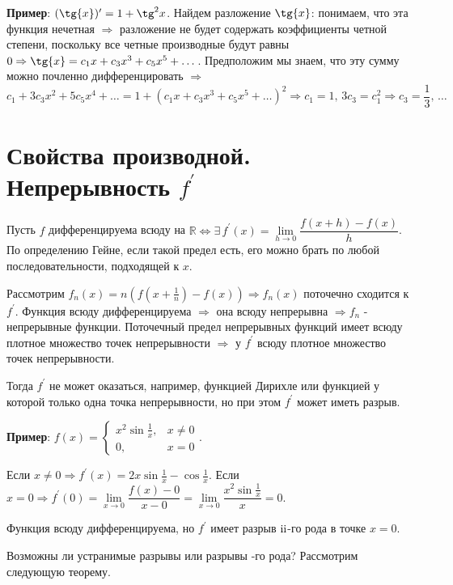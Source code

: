 \documentclass[12pt]{article}
\newcommand{\RN}[1]{%
	\textup{\uppercase\expandafter{\romannumeral#1}}%
}
\newcommand{\MR}{\mathbb{R}}
\theoremstyle{definition}
\begin{document}
\textbf{Пример}: $(\tg{x})^\prime = 1 + \tg^2{x}$. Найдем разложение $\tg{x}$: понимаем, что эта функция нечетная $\Rightarrow$ разложение не будет содержать коэффициенты четной степени, поскольку все четные производные будут равны $0 \Rightarrow \tg{x} = c_1x + c_3x^3 + c_5x^5 + \dotsc$. Предположим мы знаем, что эту сумму можно почленно дифференцировать $\Rightarrow$
$$c_1 + 3c_3x^2 + 5c_5x^4 + \dotsc = 1 + (c_1x + c_3x^3 + c_5x^5 + \dotsc)^2\Rightarrow c_1 = 1, \, 3c_3 = c_1^2 \Rightarrow c_3 = \frac{1}{3}, \, \dotsc$$  

\newpage
\section*{Свойства производной. Непрерывность $f^\prime$}

Пусть $f$ дифференцируема всюду на $\MR \Leftrightarrow \exists \, f^\prime(x) = \lim\limits_{h \to 0} \dfrac{f(x+h) - f(x)}{h}$. По определению Гейне, если такой предел есть, его можно брать по любой последовательности, подходящей к $x$. 

Рассмотрим $f_n(x) = n(f(x + \frac{1}{n}) - f(x)) \Rightarrow f_n(x)$ поточечно сходится к $f^\prime$. Функция всюду дифференцируема $\Rightarrow$ она всюду непрерывна $\Rightarrow f_n$ - непрерывные функции. Поточечный предел непрерывных функций имеет всюду плотное множество точек непрерывности $\Rightarrow$ у $f^\prime$ всюду плотное множество точек непрерывности. 

Тогда $f^\prime$ не может оказаться, например, функцией Дирихле или функцией у которой только одна точка непрерывности, но при этом $f^\prime$ может иметь разрыв.

\textbf{Пример}: $f(x) = \begin{cases} x^2\sin{\frac{1}{x}}, & x \neq 0\\  0, &  x = 0
\end{cases}$. 

Если $x \neq 0 \Rightarrow f^\prime(x) = 2x\sin{\frac{1}{x}} - \cos{\frac{1}{x}}$. Если $x = 0 \Rightarrow f^\prime(0) = \lim\limits_{x \to 0}\dfrac{f(x) - 0}{x - 0} = \lim\limits_{x \to 0}\dfrac{x^2 \sin{\frac{1}{x}}}{x} = 0$. 

Функция всюду дифференцируема, но $f^\prime$ имеет разрыв $\RN{2}$-го рода в точке $x = 0$. 

Возможны ли устранимые разрывы или разрывы \RN{1}-го рода? Рассмотрим следующую теорему.
\end{document}
